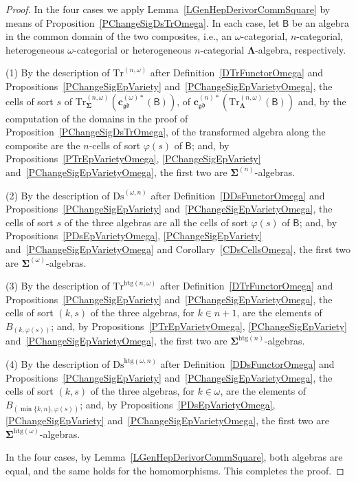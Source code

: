 \documentclass[a4paper, reqno]{amsbook}
\newcommand{\sig}[1]{\mathbf{#1}}             %
\newcommand{\calg}[1]{\boldsymbol{\mathsf{#1}}} %
\newcommand{\gd}{\mathfrak{gd}}              %
\newcommand{\htg}{\mathrm{htg}}                %
\newcommand{\Ds}{\mathrm{Ds}}
\newcommand{\Tr}{\mathrm{Tr}}
\theoremstyle{plain}
\theoremstyle{definition}
\begin{document}
\begin{proof}
In the four cases we apply Lemma~\ref{LGenHepDerivorCommSquare} by means of Proposition~\ref{PChangeSigDsTrOmega}.
In each case, let $\calg{B}$ be an algebra in the common domain of the two composites, i.e., an $\omega$-categorial, $n$-categorial, heterogeneous $\omega$-categorial or heterogeneous $n$-categorial $\sig{\Lambda}$-algebra, respectively.

(1) By the description of $\Tr^{(n,\omega)}$ after Definition~\ref{DTrFunctorOmega} and Propositions~\ref{PChangeSigEpVariety} and~\ref{PChangeSigEpVarietyOmega}, the cells of sort $s$ of $\Tr^{(n,\omega)}_{\sig{\Sigma}}(\mathbf{c}^{(\omega)\ast}_{\gd}(\calg{B}))$, of $\mathbf{c}^{(n)\ast}_{\gd}(\Tr^{(n,\omega)}_{\sig{\Lambda}}(\calg{B}))$ and, by the computation of the domains in the proof of Proposition~\ref{PChangeSigDsTrOmega}, of the transformed algebra along the composite are the $n$-cells of sort $\varphi(s)$ of $\calg{B}$; and, by Propositions~\ref{PTrEpVarietyOmega}, \ref{PChangeSigEpVariety} and~\ref{PChangeSigEpVarietyOmega}, the first two are $\sig{\Sigma}^{(n)}$-algebras.

(2) By the description of $\Ds^{(\omega,n)}$ after Definition~\ref{DDsFunctorOmega} and Propositions~\ref{PChangeSigEpVariety} and~\ref{PChangeSigEpVarietyOmega}, the cells of sort $s$ of the three algebras are all the cells of sort $\varphi(s)$ of $\calg{B}$; and, by Propositions~\ref{PDsEpVarietyOmega}, \ref{PChangeSigEpVariety} and~\ref{PChangeSigEpVarietyOmega} and Corollary~\ref{CDsCellsOmega}, the first two are $\sig{\Sigma}^{(\omega)}$-algebras.

(3) By the description of $\Tr^{\htg(n,\omega)}$ after Definition~\ref{DTrFunctorOmega} and Propositions~\ref{PChangeSigEpVariety} and~\ref{PChangeSigEpVarietyOmega}, the cells of sort $(k,s)$ of the three algebras, for $k\in n+1$, are the elements of $B_{(k,\varphi(s))}$; and, by Propositions~\ref{PTrEpVarietyOmega}, \ref{PChangeSigEpVariety} and~\ref{PChangeSigEpVarietyOmega}, the first two are $\sig{\Sigma}^{\htg(n)}$-algebras.

(4) By the description of $\Ds^{\htg(\omega,n)}$ after Definition~\ref{DDsFunctorOmega} and Propositions~\ref{PChangeSigEpVariety} and~\ref{PChangeSigEpVarietyOmega}, the cells of sort $(k,s)$ of the three algebras, for $k\in\omega$, are the elements of $B_{(\min\{k,n\},\varphi(s))}$; and, by Propositions~\ref{PDsEpVarietyOmega}, \ref{PChangeSigEpVariety} and~\ref{PChangeSigEpVarietyOmega}, the first two are $\sig{\Sigma}^{\htg(\omega)}$-algebras.

In the four cases, by Lemma~\ref{LGenHepDerivorCommSquare}, both algebras are equal, and the same holds for the homomorphisms. This completes the proof.
\end{proof}
\end{document}
